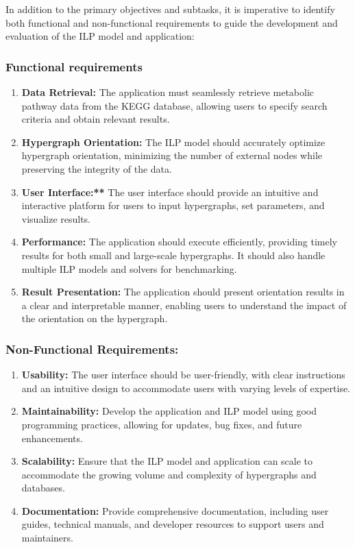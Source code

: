 In addition to the primary objectives and subtasks, it is imperative to identify both functional and non-functional requirements to guide the development and evaluation of the ILP model and application:

\subsubsection{Functional requirements}

\begin{enumerate}
    \item \textbf{Data Retrieval:} The application must seamlessly retrieve metabolic pathway data from the KEGG database, allowing users to specify search criteria and obtain relevant results.
    \item \textbf{Hypergraph Orientation:} The ILP model should accurately optimize hypergraph orientation, minimizing the number of external nodes while preserving the integrity of the data.
    \item \textbf{User Interface:**} The user interface should provide an intuitive and interactive platform for users to input hypergraphs, set parameters, and visualize results.
    \item \textbf{Performance:} The application should execute efficiently, providing timely results for both small and large-scale hypergraphs. It should also handle multiple ILP models and solvers for benchmarking.
    \item \textbf{Result Presentation:} The application should present orientation results in a clear and interpretable manner, enabling users to understand the impact of the orientation on the hypergraph.
\end{enumerate}

\subsubsection{Non-Functional Requirements:}
\begin{enumerate}
    \item \textbf{Usability:} The user interface should be user-friendly, with clear instructions and an intuitive design to accommodate users with varying levels of expertise.
    \item \textbf{Maintainability:} Develop the application and ILP model using good programming practices, allowing for updates, bug fixes, and future enhancements.
    \item \textbf{Scalability:} Ensure that the ILP model and application can scale to accommodate the growing volume and complexity of hypergraphs and databases.
    \item \textbf{Documentation:} Provide comprehensive documentation, including user guides, technical manuals, and developer resources to support users and maintainers.
\end{enumerate}

